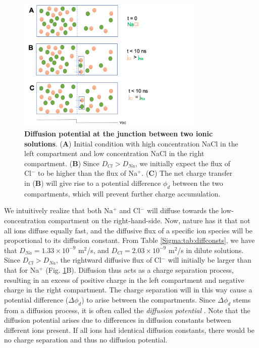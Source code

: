\begin{figure}[!ht]
\begin{center}
\includegraphics[width=0.8\textwidth]{Figures/Eldiff/Diffusionpot.png}
\end{center}
\caption{\textbf{Diffusion potential at the junction between two ionic solutions}. ({\bf A}) Initial condition with high concentration NaCl in the left compartment and low concentration NaCl in the right compartment. ({\bf B}) Since $D_{Cl} > D_{Na}$, we initially expect the flux of Cl$^-$ to be higher than the flux of Na$^+$. ({\bf C}) The net charge transfer in ({\bf B}) will give rise to a potential difference $\phi_d$ between the two compartments, which will prevent further charge accumulation. }
\label{Eldiff:fig:diffpot}
\end{figure}

We intuitively realize that both Na$^+$ and Cl$^-$ will diffuse towards the low-concentration compartment on the right-hand-side. Now, nature has it that not all ions diffuse equally fast, and the diffusive flux of a specific ion species will be proportional to its diffusion constant. From Table \ref{Sigma:tab:diffconsts}, we have that $D_{Na} = 1.33 \times 10^{-9}$ m$^2$/s, and $D_{Cl} = 2.03 \times 10^{-9}$ m$^2$/s in dilute solutions. Since $D_{Cl} > D_{Na}$, the rightward diffusive flux of Cl$^-$ will initially be larger than that for Na$^+$  (Fig. \ref{Eldiff:fig:diffpot}B). Diffusion thus acts as a charge separation process, resulting in an excess of positive charge in the left compartment and negative charge in the right compartment. The charge separation will in this way cause a potential difference ($\Delta \phi_d$) to arise between the compartments. Since $\Delta \phi_d$ stems from a diffusion process, it is often called the \textit{diffusion potential} . Note that the diffusion potential arises due to differences in diffusion constants between different ions present. If all ions had identical diffusion constants, there would be no charge separation and thus no diffusion potential. 

